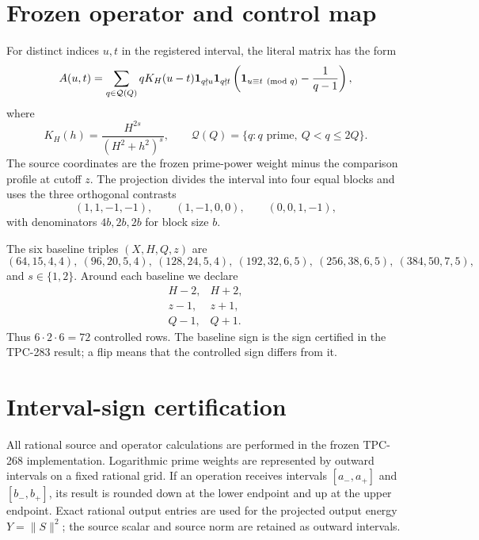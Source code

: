 \documentclass[11pt]{article}
\begin{document}
\section{Frozen operator and control map}

For distinct indices $u,t$ in the registered interval, the literal matrix has
the form
\begin{equation}
 A(u,t)=\sum_{q\in\mathcal Q(Q)}qK_H(u-t)
 {\bf 1}_{q\nmid u}{\bf 1}_{q\nmid t}
 \left({\bf 1}_{u\equiv t\pmod q}-\frac{1}{q-1}\right),
 \label{eq:operator}
\end{equation}
where
\begin{equation}
 K_H(h)=\frac{H^{2s}}{(H^2+h^2)^s},
 \qquad \mathcal Q(Q)=\{q:q\text{ prime},\ Q<q\leq 2Q\}.
 \label{eq:kernel}
\end{equation}
The source coordinates are the frozen prime-power weight minus the comparison
profile at cutoff $z$.  The projection divides the interval into four equal
blocks and uses the three orthogonal contrasts
\begin{equation}
 (1,1,-1,-1),\qquad(1,-1,0,0),\qquad(0,0,1,-1),
 \label{eq:contrasts}
\end{equation}
with denominators $4b,2b,2b$ for block size $b$.

The six baseline triples $(X,H,Q,z)$ are
\begin{equation}
 (64,15,4,4),\ (96,20,5,4),\ (128,24,5,4),\
 (192,32,6,5),\ (256,38,6,5),\ (384,50,7,5),
 \label{eq:baseline}
\end{equation}
and $s\in\{1,2\}$.  Around each baseline we declare
\begin{equation}
 \begin{array}{lll}
 H-2,&H+2,\\[-2pt]
 z-1,&z+1,\\[-2pt]
 Q-1,&Q+1.
 \end{array}
 \label{eq:controls}
\end{equation}
Thus $6\cdot2\cdot6=72$ controlled rows.  The baseline sign is the
sign certified in the TPC-283 result; a flip means that the controlled sign
differs from it.

\section{Interval-sign certification}

All rational source and operator calculations are performed in the frozen
TPC-268 implementation.  Logarithmic prime weights are represented by
outward intervals on a fixed rational grid.  If an operation receives
intervals $[a_-,a_+]$ and $[b_-,b_+]$, its result is rounded down at the lower
endpoint and up at the upper endpoint.  Exact rational output entries are
used for the projected output energy $Y=\|S\|^2$; the source scalar and source
norm are retained as outward intervals.
\end{document}

